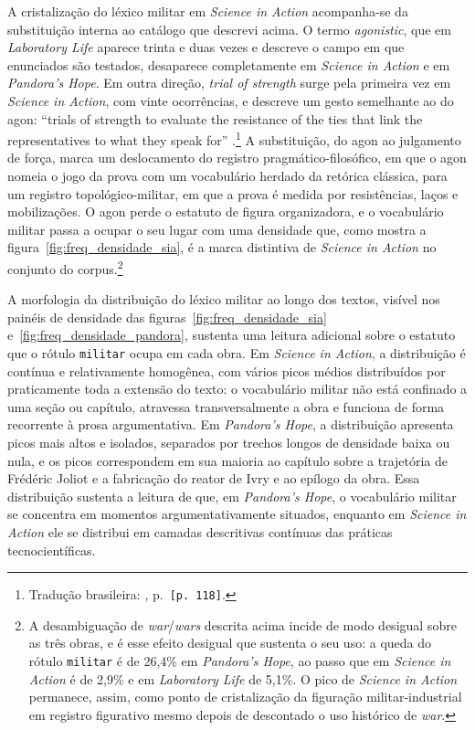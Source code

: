 A cristalização do léxico militar em \emph{Science in Action} acompanha-se da substituição interna ao catálogo que descrevi acima. O termo \textit{agonistic}, que em \emph{Laboratory Life} aparece trinta e duas vezes e descreve o campo em que enunciados são testados, desaparece completamente em \emph{Science in Action} e em \emph{Pandora's Hope}. Em outra direção, \textit{trial of strength} surge pela primeira vez em \emph{Science in Action}, com vinte ocorrências, e descreve um gesto semelhante ao do agon: \enquote{trials of strength to evaluate the resistance of the ties that link the representatives to what they speak for} \parencite[p.~93]{Latour1987Science}.\footnote{Tradução brasileira: \textcite{Latour2011CienciaEmAcao}, p.~\texttt{[p. 118]}.} A substituição, do agon ao julgamento de força, marca um deslocamento do registro pragmático-filosófico, em que o agon nomeia o jogo da prova com um vocabulário herdado da retórica clássica, para um registro topológico-militar, em que a prova é medida por resistências, laços e mobilizações. O agon perde o estatuto de figura organizadora, e o vocabulário militar passa a ocupar o seu lugar com uma densidade que, como mostra a figura~\ref{fig:freq_densidade_sia}, é a marca distintiva de \emph{Science in Action} no conjunto do corpus.\footnote{A desambiguação de \textit{war}/\textit{wars} descrita acima incide de modo desigual sobre as três obras, e é esse efeito desigual que sustenta o seu uso: a queda do rótulo \texttt{militar} é de 26,4\% em \emph{Pandora's Hope}, ao passo que em \emph{Science in Action} é de 2,9\% e em \emph{Laboratory Life} de 5,1\%. O pico de \emph{Science in Action} permanece, assim, como ponto de cristalização da figuração militar-industrial em registro figurativo mesmo depois de descontado o uso histórico de \textit{war}.}

A morfologia da distribuição do léxico militar ao longo dos textos, visível nos painéis de densidade das figuras~\ref{fig:freq_densidade_sia} e~\ref{fig:freq_densidade_pandora}, sustenta uma leitura adicional sobre o estatuto que o rótulo \texttt{militar} ocupa em cada obra. Em \emph{Science in Action}, a distribuição é contínua e relativamente homogênea, com vários picos médios distribuídos por praticamente toda a extensão do texto: o vocabulário militar não está confinado a uma seção ou capítulo, atravessa transversalmente a obra e funciona de forma recorrente à prosa argumentativa. Em \emph{Pandora's Hope}, a distribuição apresenta picos mais altos e isolados, separados por trechos longos de densidade baixa ou nula, e os picos correspondem em sua maioria ao capítulo sobre a trajetória de Frédéric Joliot e a fabricação do reator de Ivry e ao epílogo da obra. Essa distribuição sustenta a leitura de que, em \emph{Pandora's Hope}, o vocabulário militar se concentra em momentos argumentativamente situados, enquanto em \emph{Science in Action} ele se distribui em camadas descritivas contínuas das práticas tecnocientíficas.

